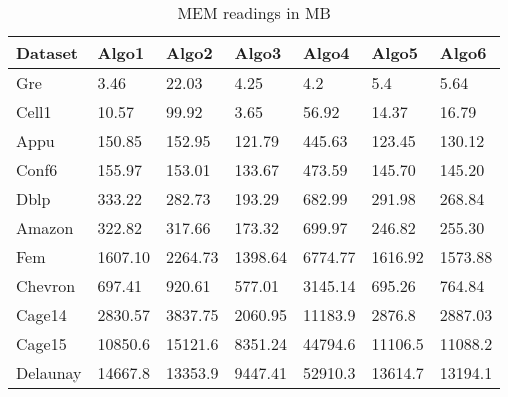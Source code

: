 

\begin{table}[th]
\begin{center}
    \begin{tabular}{| l | l | l | l | l | l | l |}
    \hline
	Dataset & Algo1 & Algo2 & Algo3 & Algo4 & Algo5 & Algo6\\ \hline
	Gre & \cellcolor{blue!25}3.46 & 22.03 & 4.25 & 4.2 & 5.4 & 5.64 \\ \hline
	Cell1 & 10.57 & 99.92 & \cellcolor{blue!25}3.65 & 56.92 & 14.37 & 16.79\\ \hline
	Appu & 150.85 & 152.95 & \cellcolor{blue!25}121.79 & 445.63 & 123.45 & 130.12\\ \hline
	Conf6 & 155.97 & 153.01 & \cellcolor{blue!25}133.67 & 473.59 & 145.70 & 145.20\\ \hline
	Dblp & 333.22 & 282.73 & \cellcolor{blue!25}193.29 & 682.99 & 291.98 & 268.84\\ \hline
	Amazon & 322.82 & 317.66 & \cellcolor{blue!25}173.32 & 699.97 & 246.82 & 255.30\\ \hline
	Fem & 1607.10 & 2264.73 & \cellcolor{blue!25}1398.64 & 6774.77 & 1616.92 & 1573.88\\ \hline
	Chevron & 697.41 & 920.61 & \cellcolor{blue!25}577.01 & 3145.14 & 695.26 & 764.84\\ \hline
	Cage14 & 2830.57 & 3837.75 & \cellcolor{blue!25}2060.95 & 11183.9 & 2876.8 & 2887.03\\ \hline
	Cage15 & 10850.6 & 15121.6 & \cellcolor{blue!25}8351.24 & 44794.6 & 11106.5 & 11088.2\\ \hline
	Delaunay & 14667.8 & 13353.9 & \cellcolor{blue!25}9447.41 & 52910.3 & 13614.7 & 13194.1\\ \hline
    \hline
    \end{tabular}
\end{center}
\caption{\capfont MEM readings in MB}
\label{tab:Table3}
\end{table}


